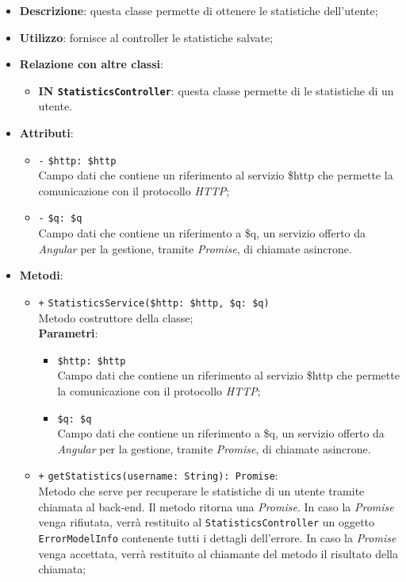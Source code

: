 \begin{itemize}
	\item \textbf{Descrizione}: questa classe permette di ottenere le statistiche dell'utente;
	\item \textbf{Utilizzo}: fornisce al controller le statistiche salvate;
	\item \textbf{Relazione con altre classi}:
	\begin{itemize}
		\item \textbf{IN \texttt{StatisticsController}}: questa classe permette di le statistiche di un utente.
	\end{itemize}
	\item \textbf{Attributi}:
	\begin{itemize}
		\item \texttt{-} \texttt{\$http: \$http} \\ Campo dati che contiene un riferimento al servizio \$http che permette la comunicazione con il protocollo \textit{HTTP};
		\item \texttt{-} \texttt{\$q: \$q} \\ Campo dati che contiene un riferimento a \$q, un servizio offerto da \textit{Angular} per la gestione, tramite \textit{Promise}, di chiamate asincrone.
	\end{itemize}
	\item \textbf{Metodi}:
	\begin{itemize}
		\item \texttt{+} \texttt{StatisticsService(\$http: \$http, \$q: \$q)} \\ Metodo costruttore della classe; \\
		\textbf{Parametri}:
		\begin{itemize}
			\item \texttt{\$http: \$http} \\ Campo dati che contiene un riferimento al servizio \$http che permette la comunicazione con il protocollo \textit{HTTP};
			\item \texttt{\$q: \$q} \\ Campo dati che contiene un riferimento a \$q, un servizio offerto da \textit{Angular} per la gestione, tramite \textit{Promise}, di chiamate asincrone.
		\end{itemize}
		\item \texttt{+} \texttt{getStatistics(username: String): Promise}: \\Metodo che serve per recuperare le statistiche di un utente tramite chiamata al back-end. Il metodo ritorna una \textit{Promise}. In caso la \textit{Promise} venga rifiutata, verrà restituito al \texttt{StatisticsController} un oggetto \texttt{ErrorModelInfo} contenente tutti i dettagli dell'errore. In caso la \textit{Promise} venga accettata, verrà restituito al chiamante del metodo il risultato della chiamata;\\

\end{itemize}
\end{itemize}
